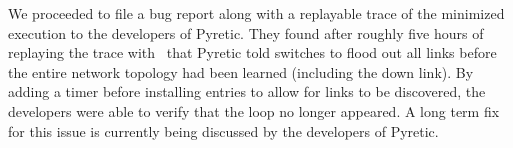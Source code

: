 
We proceeded to file a bug report along with a replayable trace of the
minimized execution to the developers of Pyretic. They found after roughly
five hours of replaying the trace with \projectname~that Pyretic told switches to
flood out all links before the entire
network topology had been learned (including the down link). By adding a timer before installing
entries to allow for links to be discovered, the developers were able to verify
that the loop no longer appeared. A long term fix for this issue is currently being discussed by the developers of
Pyretic.\\[0.5ex]
